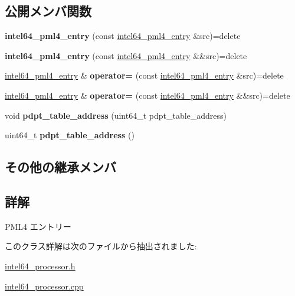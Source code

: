 \subsection*{公開メンバ関数}
\begin{DoxyCompactItemize}
\item 
\hypertarget{classintel64__pml4__entry_aa6b703474769f6a50a5c0a650d7ab054}{}{\bfseries intel64\+\_\+pml4\+\_\+entry} (const \hyperlink{classintel64__pml4__entry}{intel64\+\_\+pml4\+\_\+entry} \&src)=delete\label{classintel64__pml4__entry_aa6b703474769f6a50a5c0a650d7ab054}

\item 
\hypertarget{classintel64__pml4__entry_a9a501655ea95565e7807d1e601ee8dbc}{}{\bfseries intel64\+\_\+pml4\+\_\+entry} (const \hyperlink{classintel64__pml4__entry}{intel64\+\_\+pml4\+\_\+entry} \&\&src)=delete\label{classintel64__pml4__entry_a9a501655ea95565e7807d1e601ee8dbc}

\item 
\hypertarget{classintel64__pml4__entry_a521515099b02b2905b67fb2036880c10}{}\hyperlink{classintel64__pml4__entry}{intel64\+\_\+pml4\+\_\+entry} \& {\bfseries operator=} (const \hyperlink{classintel64__pml4__entry}{intel64\+\_\+pml4\+\_\+entry} \&src)=delete\label{classintel64__pml4__entry_a521515099b02b2905b67fb2036880c10}

\item 
\hypertarget{classintel64__pml4__entry_a92ee32ab153d91b61321ec40ca243f9f}{}\hyperlink{classintel64__pml4__entry}{intel64\+\_\+pml4\+\_\+entry} \& {\bfseries operator=} (const \hyperlink{classintel64__pml4__entry}{intel64\+\_\+pml4\+\_\+entry} \&\&src)=delete\label{classintel64__pml4__entry_a92ee32ab153d91b61321ec40ca243f9f}

\item 
\hypertarget{classintel64__pml4__entry_a6069d5d2bb56d249c485038171e138f1}{}void {\bfseries pdpt\+\_\+table\+\_\+address} (uint64\+\_\+t pdpt\+\_\+table\+\_\+address)\label{classintel64__pml4__entry_a6069d5d2bb56d249c485038171e138f1}

\item 
\hypertarget{classintel64__pml4__entry_ae0d9b34a4017d1f36735184fb12d30c4}{}uint64\+\_\+t {\bfseries pdpt\+\_\+table\+\_\+address} ()\label{classintel64__pml4__entry_ae0d9b34a4017d1f36735184fb12d30c4}

\end{DoxyCompactItemize}
\subsection*{その他の継承メンバ}


\subsection{詳解}
P\+M\+L4 エントリー 

このクラス詳解は次のファイルから抽出されました\+:\begin{DoxyCompactItemize}
\item 
\hyperlink{intel64__processor_8h}{intel64\+\_\+processor.\+h}\item 
\hyperlink{intel64__processor_8cpp}{intel64\+\_\+processor.\+cpp}\end{DoxyCompactItemize}
